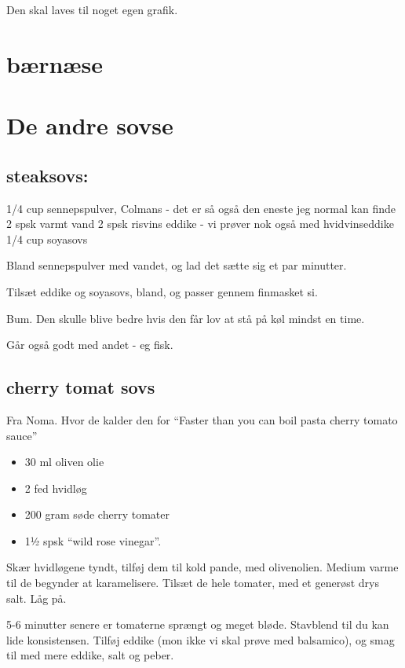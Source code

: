 \documentclass[
]{book}
\providecommand{\tightlist}{%
  \setlength{\itemsep}{0pt}\setlength{\parskip}{0pt}}
\begin{document}
Den skal laves til noget egen grafik.

\section{bærnæse}\label{buxe6rnuxe6se}

\section{De andre sovse}\label{de-andre-sovse}

\subsection{steaksovs:}\label{steaksovs}

1/4 cup sennepspulver, Colmans - det er så også den eneste jeg normal kan finde
2 spsk varmt vand
2 spsk risvins eddike - vi prøver nok også med hvidvinseddike
1/4 cup soyasovs

Bland sennepspulver med vandet, og lad det sætte sig et par minutter.

Tilsæt eddike og soyasovs, bland, og passer gennem finmasket si.

Bum. Den skulle blive bedre hvis den får lov at stå på køl mindst en time.

Går også godt med andet - eg fisk.

\subsection{cherry tomat sovs}\label{cherry-tomat-sovs}

Fra Noma. Hvor de kalder den for ``Faster than you can boil pasta cherry tomato sauce''

\begin{itemize}
\tightlist
\item
  30 ml oliven olie
\item
  2 fed hvidløg
\item
  200 gram søde cherry tomater
\item
  1½ spsk ``wild rose vinegar''.
\end{itemize}

Skær hvidløgene tyndt, tilføj dem til kold pande, med olivenolien.
Medium varme til de begynder at karamelisere.
Tilsæt de hele tomater, med et generøst drys salt. Låg på.

5-6 minutter senere er tomaterne sprængt og meget bløde. Stavblend til du kan lide konsistensen. Tilføj
eddike (mon ikke vi skal prøve med balsamico), og smag til med mere eddike, salt og peber.
\end{document}
